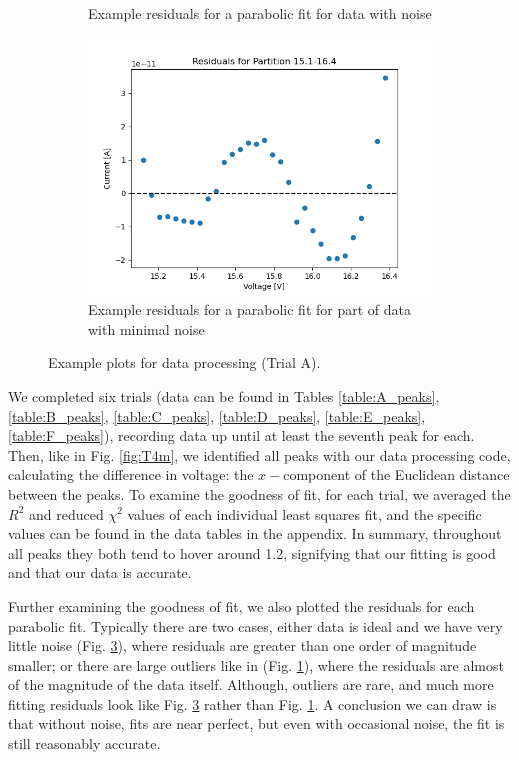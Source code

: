 \documentclass[12pt]{article}
\begin{document}
\begin{figure}[h!]
\begin{subfigure}{0.45\textwidth}
        \caption{Example residuals for a parabolic fit for data with noise}
        \label{fig:residuals1}
    \end{subfigure}
    \hfill
    \begin{subfigure}{0.45\textwidth}
        \includegraphics[width=\textwidth]{figure/Plots/5.png}
        \caption{Example residuals for a parabolic fit for part of data with minimal noise}
        \label{fig:residuals2}
    \end{subfigure}
    \caption{Example plots for data processing (Trial A).}
\end{figure}


We completed six trials (data can be found in Tables \ref{table:A_peaks}, \ref{table:B_peaks}, \ref{table:C_peaks}, \ref{table:D_peaks}, \ref{table:E_peaks}, \ref{table:F_peaks}), recording data up until at least the seventh peak for each. Then, like in Fig. \ref{fig:T4m}, we identified all peaks with our data processing code, calculating the difference in voltage: the $x-$component of the Euclidean distance between the peaks. To examine the goodness of fit, for each trial, we averaged the $R^2$ and reduced $\chi^2$ values of each individual least squares fit, and the specific values can be found in the data tables in the appendix. In summary, throughout all peaks they both tend to hover around 1.2, signifying that our fitting is good and that our data is accurate.

Further examining the goodness of fit, we also plotted the residuals for each parabolic fit. Typically there are two cases, either data is ideal and we have very little noise (Fig. \ref{fig:residuals2}), where residuals are greater than one order of magnitude smaller; or there are large outliers like in (Fig. \ref{fig:residuals1}), where the residuals are almost of the magnitude of the data itself. Although, outliers are rare, and much more fitting residuals look like Fig. \ref{fig:residuals2} rather than Fig. \ref{fig:residuals1}. A conclusion we can draw is that without noise, fits are near perfect, but even with occasional noise, the fit is still reasonably accurate.
\end{document}
